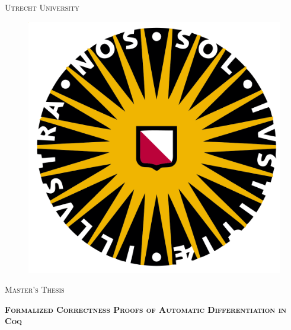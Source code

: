 \begin{titlepage}

  \center
  \textsc{\Huge Utrecht University}

  \vspace{0.3in}
  \begin{figure}[H]
    \centering
    \includegraphics[scale=0.09]{assets/UU_logo.png}
  \end{figure}

  \thispagestyle{fancy}

  \center
  \textsc{\Large Master's Thesis}

  \vspace{0.5in}

  \noindent\makebox[\linewidth]{\rule{\linewidth}{1.2pt}}
  \vspace{0.03in}

  \begin{doublespace}
  \textsc{\textbf{\huge Formalized Correctness Proofs of Automatic Differentiation in Coq}}
  \end{doublespace}

  \vspace{0.03in}
  \noindent\makebox[\linewidth]{\rule{\linewidth}{1.2pt}}

  \vspace{0.5in}


\end{titlepage}
